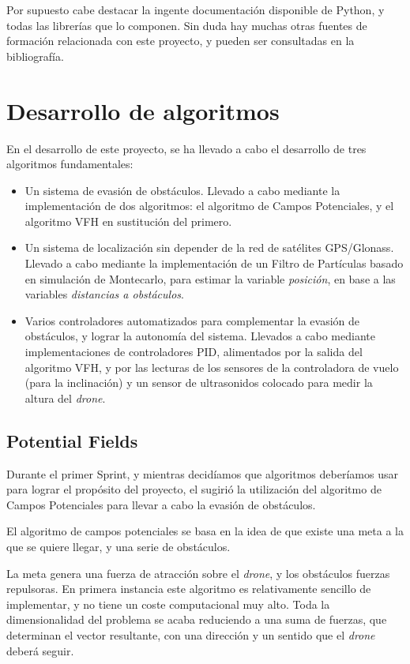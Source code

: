 Por supuesto cabe destacar la ingente documentación disponible de Python, y todas las librerías que lo componen.
Sin duda hay muchas otras fuentes de formación relacionada con este proyecto, y pueden ser consultadas en la bibliografía. 



\section{Desarrollo de algoritmos}

En el desarrollo de este proyecto, se ha llevado a cabo el desarrollo de tres algoritmos fundamentales: 

\begin{itemize}

\item Un sistema de evasión de obstáculos. Llevado a cabo mediante la implementación de dos algoritmos: el algoritmo de Campos Potenciales, y el algoritmo VFH en sustitución del primero.
\item Un sistema de localización sin depender de la red de satélites GPS/Glonass. Llevado a cabo mediante la implementación de un Filtro de Partículas basado en simulación de Montecarlo, para estimar la variable \emph{posición}, en base a las variables \emph{distancias a obstáculos}.
\item Varios controladores automatizados para complementar la evasión de obstáculos, y lograr la autonomía del sistema. Llevados a cabo mediante implementaciones de controladores PID, alimentados por la salida del algoritmo VFH, y por las lecturas de los sensores de la controladora de vuelo (para la inclinación) y un sensor de ultrasonidos colocado para medir la altura del \emph{drone}.
\end{itemize}

\subsection{Potential Fields}

Durante el primer Sprint, y mientras decidíamos que algoritmos deberíamos usar para lograr el propósito del proyecto, el \tutor{} sugirió la utilización del algoritmo de Campos Potenciales para llevar a cabo la evasión de obstáculos.

El algoritmo de campos potenciales se basa en la idea de que existe una meta a la que se quiere llegar, y una serie de obstáculos. 

La meta genera una fuerza de atracción sobre el \emph{drone}, y los obstáculos fuerzas repulsoras. 
En primera instancia este algoritmo es relativamente sencillo de implementar, y no tiene un coste computacional muy alto. Toda la dimensionalidad del problema se acaba reduciendo a una suma de fuerzas, que determinan el vector resultante, con una dirección y un sentido que el \emph{drone} deberá seguir. 

